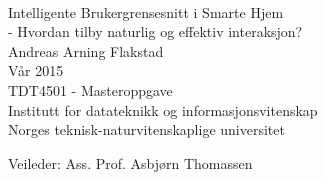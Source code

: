 \thispagestyle{empty}
\mbox{}\\[6pc]
\begin{center}
\Huge{Intelligente Brukergrensesnitt i Smarte Hjem}\\[1pc]

\Large{- Hvordan tilby naturlig og effektiv interaksjon?}
\\[2pc]

\Large{Andreas Arning Flakstad}\\[1pc]
\large{Vår 2015}\\[2pc]

TDT4501 - Masteroppgave\\
Institutt for datateknikk og informasjonsvitenskap\\
Norges teknisk-naturvitenskaplige universitet
\end{center}
\vfill

\noindent Veileder: Ass. Prof. Asbjørn Thomassen


